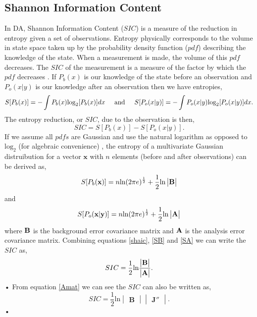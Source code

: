 \documentclass[11pt]{article}
\begin{document}
\subsection{Shannon Information Content}%

In DA, Shannon Information Content ($SIC$) is a measure of the reduction in entropy given a set of observations. Entropy physically corresponds to the volume in state space taken up by the probability density function ($pdf$) describing the knowledge of the state. When a measurement is made, the volume of this $pdf$ decreases. The $SIC$ of the measurement is a measure of the factor by which the $pdf$ decreases \cite{rodgers2000inverse}. If $P_b(x)$ is our knowledge of the state before an observation and $P_o(x|y)$ is our knowledge after an observation then we have entropies,
\[
S[P_b(x)] = - \int P_b(x)\text{log}_2[P_b(x)]dx
 \hspace{5mm} \text{and} \hspace{5mm} 
S[P_o(x|y)] = - \int P_o(x|y)\text{log}_2[P_o(x|y)]dx.
\]
The entropy reduction, or $SIC$, due to the observation is then,
\begin{equation} \label{shaic}
SIC =  S[P_b(x)]-S[P_o(x|y)].
\end{equation}
If we assume all $pdfs$ are Gaussian and use the natural logarithm as opposed to $\text{log}_2$ (for algebraic convenience) \cite{rodgers2000inverse}, the entropy of a multivariate Gaussian distruibution for a vector $\textbf{x}$ with $n$ elements (before and after observations) can be derived as,
\begin{equation} \label{SB}
 S[P_b(\textbf{x})] = n\text{ln}(2\pi e)^{\frac{1}{2}}+\frac{1}{2}\text{ln}\begin{vmatrix}\bf{B}\end{vmatrix}
\end{equation}
and
\begin{equation} \label{SA}
 S[P_o(\textbf{x}|\textbf{y})] = n\text{ln}(2\pi e)^{\frac{1}{2}}+\frac{1}{2}\text{ln}\begin{vmatrix}\bf{A}\end{vmatrix}
\end{equation}
where $\bf{B}$ is the background error covariance matrix and $\bf{A}$ is the analysis error covariance matrix. Combining equations \ref{shaic}, \ref{SB} and \ref{SA} we can write the $SIC$ as,
\begin{equation}
SIC=\frac{1}{2}\text{ln}\frac{\begin{vmatrix} \bf{B} \end{vmatrix}}{\begin{vmatrix} \bf{A} \end{vmatrix}}.
\end{equation}•
From equation \ref{Amat} we can see the $SIC$ can also be written as,
\begin{equation}
SIC= \frac{1}{2}\text{ln}\begin{vmatrix} \mathbf{B} \end{vmatrix}\begin{vmatrix} \mathbf{J}'' \end{vmatrix}. \label{sic}
\end{equation}•
\end{document}
